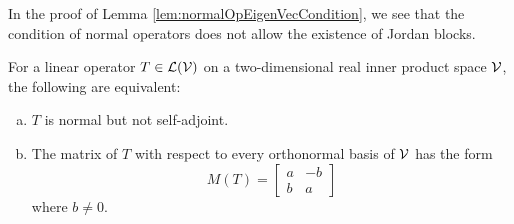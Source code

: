\begin{rem}
  In the proof of Lemma \ref{lem:normalOpEigenVecCondition},
  we see that the condition of normal operators
  does not allow the existence of Jordan blocks.
\end{rem}

\begin{thm}
  \label{thm:normalFormInRealIPspaces}
  For a linear operator $T\in {\cal L}({\cal V})$
  on a two-dimensional real inner product space ${\cal V}$, 
  the following are equivalent:
  \begin{enumerate}[(a)]\itemsep0em
  \item $T$ is normal but not self-adjoint.
  \item The matrix of $T$ with respect to every orthonormal basis of
    ${\cal V}$ has the form
    \begin{equation}
      \label{eq:normalFormInRealIPspaces}
      M(T) =
      \begin{bmatrix}
        a & -b
        \\
        b & a
      \end{bmatrix}
    \end{equation}
    where $b\ne 0$.
  \end{enumerate}
\end{thm}
